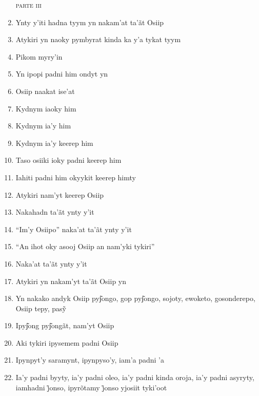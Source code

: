 \begin{enumerate}
 \begin{flushright}\textsc{parte iii}\end{flushright}
 
 \item Ynty y'iti hadna tyym yn nakam'at ta'ãt Osiip
 \item Atykiri yn naoky pymbyrat kinda ka y'a tykat tyym
 \item Pikom myry'in
 \item Yn ipopi padni him ondyt yn
 
 \begin{center}\end{center}
 
 \item Osiip naakat ise'at
 \item Kydnym iaoky him
 \item Kydnym ia'y him
 \item Kydnym ia'y keerep him
 \item Taso osiiki ioky padni keerep him
 \item Iahiti padni him okyykit keerep himty
 \item Atykiri nam'yt keerep Osiip
 
 \begin{center}\end{center}
 
 \item Nakahadn ta'ãt ynty y'it
 \item ``Im'y Osiipo'' naka'at ta'ãt ynty y'it
 
 \begin{center}\end{center}
 
 \item ``An ihot oky asooj Osiip an nam'yki tykiri''
 \item Naka'at ta'ãt ynty y'it
 \item Atykiri yn nakam'yt ta'ãt Osiip yn
 \item Yn nakako andyk Osiip pyj͂ongo, gop pyj͂ongo, sojoty, ewoketo, gosonderepo, Osiip tepy, pasỹ
 \item Ipyj͂ong pyj͂ongãt, nam'yt Osiip
 \item Aki tykiri ipysemem padni Osiip
 
 \begin{center}\end{center}
 
 \item Ipynpyt'y saramynt, ipynpyso'y, iam'a padni 'a
 \item Ia’y padni byyty, ia’y padni oleo, ia’y padni kinda oroja, ia’y padni asyryty, iamhadni j̃onso, ipyrõtamy j̃onso yjosiit tyki’oot
 

\end{enumerate}
